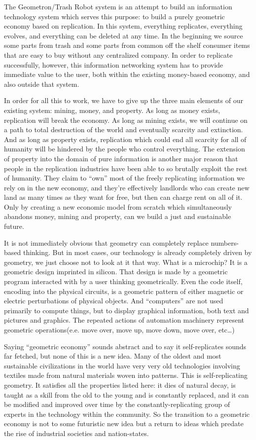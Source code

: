 The Geometron/Trash Robot system is an attempt to build an information
technology system which serves this purpose: to build a purely geometric
economy based on replication. In this system, everything replicates,
everything evolves, and everything can be deleted at any time. In the
beginning we source some parts from trash and some parts from common off
the shelf consumer items that are easy to buy without any centralized
company. In order to replicate successfully, however, this information
networking system has to provide immediate value to the user, both
within the existing money-based economy, and also outside that system.

In order for all this to work, we have to give up the three main
elements of our existing system: mining, money, and property. As long as
money exists, replication will break the economy. As long as mining
exists, we will continue on a path to total destruction of the world and
eventually scarcity and extinction. And as long as property exists,
replication which could end all scarcity for all of humanity will be
hindered by the people who control everything. The extension of property
into the domain of pure information is another major reason that people
in the replication industries have been able to so brutally exploit the
rest of humanity. They claim to ``own'' most of the freely replicating
information we rely on in the new economy, and they're effectively
landlords who can create new land as many times as they want for free,
but then can charge rent on all of it. Only by creating a new economic
model from scratch which simultaneously abandons money, mining and
property, can we build a just and sustainable future.

It is not immediately obvious that geometry can completely replace
numbers-based thinking. But in most cases, our technology is already
completely driven by geometry, we just choose not to look at it that
way. What is a microchip? It is a geometric design imprinted in silicon.
That design is made by a geometric program interacted with by a user
thinking geometrically. Even the code itself, encoding into the physical
circuits, is a geometric pattern of either magnetic or electric
perturbations of physical objects. And ``computers'' are not used
primarily to compute things, but to display graphical information, both
text and pictures and graphics. The repeated actions of automation
machinery represent geometric operations(e.e. move over, move up, move
down, move over, etc\ldots{})

Saying ``geometric economy'' sounds abstract and to say it
self-replicates sounds far fetched, but none of this is a new idea. Many
of the oldest and most sustainable civilizations in the world have very
very old technologies involving textiles made from natural materials
woven into patterns. This is self-replicating geometry. It satisfies all
the properties listed here: it dies of natural decay, is taught as a
skill from the old to the young and is constantly replaced, and it can
be modified and improved over time by the constantly-replicating group
of experts in the technology within the community. So the transition to
a geometric economy is not to some futuristic new idea but a return to
ideas which predate the rise of industrial societies and nation-states.


